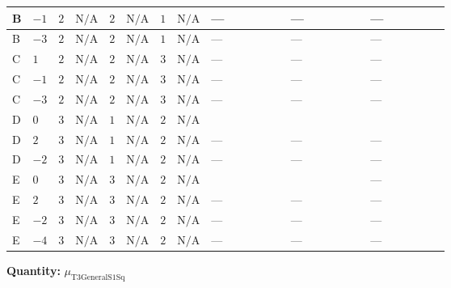 \documentclass[8pt]{article}
\begin{document}
\begin{landscape}
\begin{longtable}{@{}llcccccc >{\raggedright\arraybackslash}p{0.21\linewidth} >{\raggedright\arraybackslash}p{0.21\linewidth} >{\raggedright\arraybackslash}p{0.21\linewidth}@{}}
\midrule
B & $-1$ & $2$ & $\text{N/A}$ & $2$ & $\text{N/A}$ & $1$ & $\text{N/A}$ & --- & --- & --- \\
\midrule
B & $-3$ & $2$ & $\text{N/A}$ & $2$ & $\text{N/A}$ & $1$ & $\text{N/A}$ & --- & --- & --- \\
\midrule
C & $1$ & $2$ & $\text{N/A}$ & $2$ & $\text{N/A}$ & $3$ & $\text{N/A}$ & --- & --- & --- \\
\midrule
C & $-1$ & $2$ & $\text{N/A}$ & $2$ & $\text{N/A}$ & $3$ & $\text{N/A}$ & --- & --- & --- \\
\midrule
C & $-3$ & $2$ & $\text{N/A}$ & $2$ & $\text{N/A}$ & $3$ & $\text{N/A}$ & --- & --- & --- \\
\midrule
D & $0$ & $3$ & $\text{N/A}$ & $1$ & $\text{N/A}$ & $2$ & $\text{N/A}$ & \scriptsize\adjustbox{max width=\linewidth}{$\begin{gathered} 40 {\lambda_{X_{6}}} \left({\mu_{\mathrm{T3GeneralS1Sq}}}\right)^{*}\end{gathered}$} & \scriptsize\adjustbox{max width=\linewidth}{$\begin{gathered} +2 {\lambda_{S_1}^{(1)}} {\mu_{\mathrm{T3GeneralS1Sq}}}\end{gathered}$} & \scriptsize\adjustbox{max width=\linewidth}{$\begin{gathered} +2 {\lambda_{X_{5}}^{(1)}} {m_2^2}\end{gathered}$} \\
\midrule
D & $2$ & $3$ & $\text{N/A}$ & $1$ & $\text{N/A}$ & $2$ & $\text{N/A}$ & --- & --- & --- \\
\midrule
D & $-2$ & $3$ & $\text{N/A}$ & $1$ & $\text{N/A}$ & $2$ & $\text{N/A}$ & --- & --- & --- \\
\midrule
E & $0$ & $3$ & $\text{N/A}$ & $3$ & $\text{N/A}$ & $2$ & $\text{N/A}$ & \scriptsize\adjustbox{max width=\linewidth}{$\begin{gathered} 40 {\lambda_{X_{6}}} \left({\mu_{\mathrm{T3GeneralS1Sq}}}\right)^{*}\end{gathered}$} & \scriptsize\adjustbox{max width=\linewidth}{$\begin{gathered} +2 {\lambda_{S_1}^{(1)}} {\mu_{\mathrm{T3GeneralS1Sq}}}\end{gathered}$} & --- \\
\midrule
E & $2$ & $3$ & $\text{N/A}$ & $3$ & $\text{N/A}$ & $2$ & $\text{N/A}$ & --- & --- & --- \\
\midrule
E & $-2$ & $3$ & $\text{N/A}$ & $3$ & $\text{N/A}$ & $2$ & $\text{N/A}$ & --- & --- & --- \\
\midrule
E & $-4$ & $3$ & $\text{N/A}$ & $3$ & $\text{N/A}$ & $2$ & $\text{N/A}$ & --- & --- & --- \\
\midrule
\bottomrule
\end{longtable}
\clearpage
\noindent\textbf{Quantity: }${\mu_{\mathrm{T3GeneralS1Sq}}}$\par\smallskip

\end{landscape}
\end{document}
